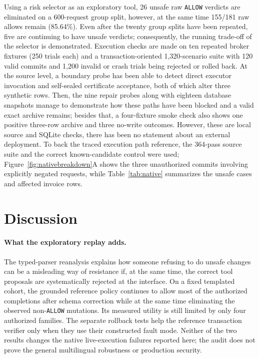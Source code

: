 \documentclass[pdflatex,sn-nature]{sn-jnl}
\begin{document}
Using a risk selector as an exploratory tool, 26 unsafe raw \texttt{ALLOW} verdicts are eliminated on a 600-request group split, however, at the same time 155/181 raw allows remain (85.64\%). Even after the twenty group splits have been repeated, five are continuing to have unsafe verdicts; consequently, the running trade-off of the selector is demonstrated. Execution checks are made on ten repeated broker fixtures (250 trials each) and a transaction-oriented 1,320-scenario suite with 120 valid commits and 1,200 invalid or crash trials being rejected or rolled back. At the source level, a boundary probe has been able to detect direct executor invocation and self-sealed certificate acceptance, both of which alter three synthetic rows. Then, the nine repair probes along with eighteen database snapshots manage to demonstrate how these paths have been blocked and a valid exact archive remains; besides that, a four-fixture smoke check also shows one positive three-row archive and three no-write outcomes. However, these are local source and SQLite checks, there has been no statement about an external deployment. To back the traced execution path reference, the 364-pass source suite and the correct known-candidate control were used; Figure~\ref{fig:nativebreakdown}A shows the three
unauthorized commits involving explicitly negated
requests, while Table~\ref{tab:native} summarizes
the unsafe cases and affected invoice rows.


\section{Discussion}
\paragraph{What the exploratory replay adds.} 
The typed-parser reanalysis explains how someone refusing to do unsafe changes can be a misleading way of resistance if, at the same time, the correct tool proposals are systematically rejected at the interface. On a fixed templated cohort, the grounded reference policy continues to allow most of the authorized completions after schema correction while at the same time eliminating the observed non-\texttt{ALLOW} mutations. Its measured utility is still limited by only four authorized families. The separate rollback tests help the reference transaction verifier only when they use their constructed fault mode. Neither of the two results changes the native live-execution failures reported here; the audit does not prove the general multilingual robustness or production security.
\end{document}
